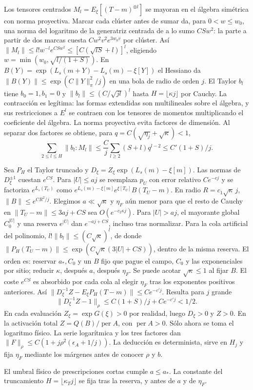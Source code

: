 Los tensores centrados $M_l=E_\xi[(T-m)^{\otimes l}]$ se mayoran en el álgebra
simétrica con norma proyectiva. Marcar cada clúster antes de sumar da, para $0<w\le w_0$,
una norma del logaritmo de la generatriz centrada de a lo sumo $CSw^2$:
la parte a partir de dos marcas cuesta $Cw^2v^2e^{3w_0v}$ por clúster.
Así $\|M_l\|\le l!w^{-l}e^{CSw^2}\le[C(\sqrt{lS}+l)]^l$, eligiendo
$w=\min(w_0,\sqrt{l/(1+S)})$. En $B(Y)=\exp(L_s(m+Y)-L_s(m)-\xi[Y])$
el Hessiano da $\|B(Y)\|\le\exp(C\|Y\|_\pi^2/j)$ en una bola de radio de orden $j$.
El Taylor $b_l$ tiene $b_0=1,b_1=0$ y
$\|b_l\|\le(C/\sqrt{jl})^l$ hasta $H=\lfloor\kappa j\rfloor$ por Cauchy.
La contracción es legítima: las formas extendidas son multilineales sobre el álgebra,
y sus restricciones a $E^l$ se contraen con los tensores de momentos multiplicando
el coeficiente del álgebra. La norma proyectiva evita factores de dimensión.
Al separar dos factores se obtiene, para $q=C(\sqrt{\eta_j}+\sqrt\kappa)<1$,
\[
 \sum_{2\le l\le H}\|b_l:M_l\|\le
 \frac Cj\sum_{l\ge2}(S+l)q^{l-2}\le C'(1+S)/j.
\]

Sea $P_H$ el Taylor truncado y $D_\xi=Z_\xi\exp(L_s(m)-\xi[m])$.
Las normas de $D_\xi^{\pm1}$ cuestan $e^{CS}$. Para $|U|\le aj$ se reemplaza
$p_U$ con error relativo $Ce^{-cj}$ y se factoriza $e^{L_s(T_U)}$
como $e^{L_s(m)-\xi[m]} e^{\xi[T_U]} B(T_U-m)$.
En radio $R=c_1\sqrt{\kappa}\,j$, $\|B\|\le e^{CR^2/j}$.
Elegimos $a\ll\sqrt\kappa$ y $\eta_F$ aún menor para que el resto de Cauchy
en $\|T_U-m\|\le3aj+CS$ sea $O(e^{-c_2\kappa j})$.
Para $|U|>aj$, el mayorante global $C_0^{|U|}$ y una reserva $e^{|U|}$
dan $e^{-aj+CS}$, incluso tras normalizar. Para la cola artificial del polinomio,
$l!\|b_l\|\le(C\sqrt\kappa)^l$, de donde
$\|P_H(T_U-m)\|\le\exp(C\sqrt\kappa(3|U|+CS))$, dentro de la misma reserva.
El orden es: reservar $a_*,C_0$ y un $B$ fijo que pague el campo, $C_0$ y las
exponenciales por sitio; reducir $\kappa$, después $a$, después $\eta_F$.
Se puede acotar $\sqrt\kappa\le1$ al fijar $B$. El coste $e^{CS}$ es absorbido
por cada cola al elegir $\eta_F$ tras los exponentes positivos anteriores.
Así $\|D_\xi^{-1}Z-E_\xi P_H(T-m)\|\le Ce^{-c'j}$. Resulta para $j$ grande
\[
 \|D_\xi^{-1}Z-1\|_\rho\le C(1+S)/j+Ce^{-c'j}<1/2.
\]
En cada evaluación $Z_\xi=\exp G(\xi)>0$ por realidad, luego $D_\xi>0$ y $Z>0$.
En la activación total $Z=Q(B)/\operatorname{per}A$, con $\operatorname{per}A>0$.
Sólo ahora se toma el logaritmo físico. La serie logarítmica y los tres factores
dan $\|F\|_\rho\le C(1+j\rho^2(\epsilon_A+1/j))$. La deducción es determinista,
sirve en $H_j$ y fija $\eta_F$ mediante los márgenes antes de conocer $\rho$ y $b$.

El umbral físico de prescripciones cortas cumple $a\le a_*$. La constante del truncamiento
$H=\lfloor\kappa_T j\rfloor$ se fija tras la reserva, y antes de $a$ y de $\eta_F$.
